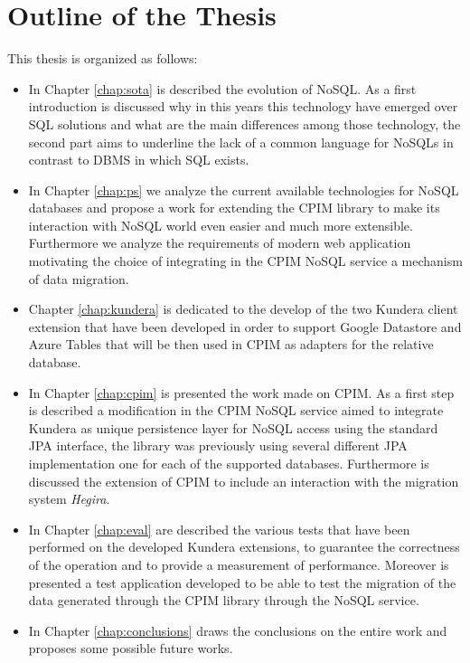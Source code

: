 \section*{Outline of the Thesis}
This thesis is organized as follows: 
\begin{itemize}
\item In Chapter \ref{chap:sota} is described the evolution of NoSQL. As a first introduction is discussed why in this years this technology have emerged over SQL solutions and what are the main differences among those technology, the second part aims to underline the lack of a common language for NoSQLs in contrast to DBMS in which SQL exists.
\item In Chapter \ref{chap:ps} we analyze the current available technologies for NoSQL databases and propose a work for extending the CPIM library to make its interaction with NoSQL world even easier and much more extensible. Furthermore we analyze the requirements of modern web application motivating the choice of integrating in the CPIM NoSQL service a mechanism of data migration.
\item Chapter \ref{chap:kundera} is dedicated to the develop of the two Kundera client extension that have been developed in order to support Google Datastore and Azure Tables that will be then used in CPIM as adapters for the relative database.
\item In Chapter \ref{chap:cpim} is presented the work made on CPIM. As a first step is described a modification in the CPIM NoSQL service aimed to integrate Kundera as unique persistence layer for NoSQL access using the standard JPA interface, the library was previously using several different JPA implementation one for each of the supported databases. Furthermore is discussed the extension of CPIM to include an interaction with the migration system \textit{Hegira}.
\item In Chapter \ref{chap:eval} are described the various tests that have been performed on the developed Kundera extensions, to guarantee the correctness of the operation and to provide a measurement of performance. Moreover is presented a test application developed to be able to test the migration of the data generated through the CPIM library through the NoSQL service.
\item In Chapter \ref{chap:conclusions} draws the conclusions on the entire work and proposes some possible future works.
\end{itemize}

